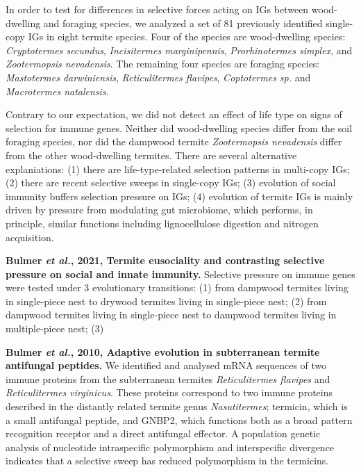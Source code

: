\documentclass[11pt]{article}
\begin{document}
\begin{sloppypar}
\par
In order to test for differences in selective forces acting on IGs between wood-dwelling and foraging species, we analyzed a set of 81 previously identified single-copy IGs in eight termite species. 
Four of the species are wood-dwelling species: \textit{Cryptotermes secundus}, \textit{Incisitermes marginipennis}, \textit{Prorhinotermes simplex}, and \textit{Zootermopsis nevadensis}. 
The remaining four species are foraging species: \textit{Mastotermes darwiniensis}, \textit{Reticulitermes flavipes}, \textit{Coptotermes sp.} and \textit{Macrotermes natalensis}. 
\par
Contrary to our expectation, we did not detect an effect of life type on signs of selection for immune genes. 
Neither did wood-dwelling species differ from the soil foraging species, nor did the dampwood termite \textit{Zootermopsis nevadensis} differ from the other wood-dwelling termites. 
There are several alternative explaniations: 
(1) there are life-type-related selection patterns in multi-copy IGs; 
(2) there are recent selective sweeps in single-copy IGs; 
(3) evolution of social immunity buffers selection pressure on IGs; 
(4) evolution of termite IGs is mainly driven by pressure from modulating gut microbiome, which performs, in principle, similar functions including lignocellulose digestion and nitrogen acquisition. 
\par
\textbf{Bulmer \textit{et al.}, 2021, Termite eusociality and contrasting selective pressure on social and innate immunity.} \newline
Selective pressure on immune genes were tested under 3 evolutionary transitions: 
(1) from dampwood termites living in single-piece nest to drywood termites living in single-piece nest; 
(2) from dampwood termites living in single-piece nest to dampwood termites living in multiple-piece nest; 
(3) 
\par
\textbf{Bulmer \textit{et al.}, 2010, Adaptive evolution in subterranean termite antifungal peptides.} \newline
We identified and analysed mRNA sequences of two immune proteins from the subterranean termites \textit{Reticulitermes flavipes} and \textit{Reticulitermes virginicus}. 
These proteins correspond to two immune proteins described in the distantly related termite genus \textit{Nasutitermes}; termicin, which is a small antifungal peptide, and GNBP2, which functions both as a broad pattern recognition receptor and a direct antifungal effector. 
A population genetic analysis of nucleotide intraspecific polymorphism and interspecific divergence indicates that a selective sweep has reduced polymorphism in the termicins. 

\end{sloppypar}
\end{document}

